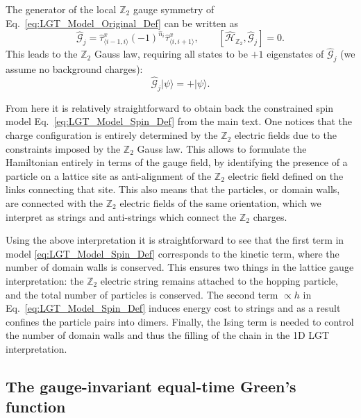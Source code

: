 \documentclass[pra,aps,showpacs,groupedaddress,superscriptaddress,twocolumn,toc=flat,biblatex,footinbib]{revtex4-1}
\newcommand{\ket}[1]{|#1\rangle}
\renewcommand{\H}{\hat{\mathcal{H}}}
\newcommand{\Zt}{$\mathbb{Z}_2$ }
\begin{document}
The generator of the local \Zt gauge symmetry of Eq.~\eqref{eq:LGT_Model_Original_Def} can be written as \cite{Prosko2017}
\begin{equation}
    \hat{\mathcal{G}}_j = \hat{\tau}^{x}_{\langle i-1, i \rangle}
    (-1)^{\hat{n}_i} \hat{\tau}^{x}_{\langle i, i+1 \rangle}, \qquad [\H_{\mathbb{Z}_2},\hat{\mathcal{G}}_j]=0.
    \label{eq:GaussLaw}
\end{equation}
This leads to the \Zt Gauss law, requiring all states to be $+1$ eigenstates of $\hat{\mathcal{G}}_j$ (we assume no background charges):
\begin{equation}
    \hat{\mathcal{G}}_j \ket{\psi} = + \ket{\psi}.
    \label{eq:GaussLawConstr1}
\end{equation}

From here it is relatively straightforward to obtain back the constrained spin model Eq.~\eqref{eq:LGT_Model_Spin_Def} from the main text. One notices that the charge configuration is entirely determined by the \Zt electric fields due to the constraints imposed by the \Zt Gauss law. This allows to formulate the Hamiltonian entirely in terms of the gauge field, by identifying  the presence of a particle on a lattice site as anti-alignment of the \Zt electric field defined on the links connecting that site. This also means that the particles, or domain walls, are connected with the \Zt electric fields of the same orientation, which we interpret as strings and anti-strings which connect the \Zt charges.

Using the above interpretation it is straightforward to see that the first term in model \eqref{eq:LGT_Model_Spin_Def} corresponds to the kinetic term, where the number of domain walls is conserved. This ensures two things in the lattice gauge interpretation: the \Zt electric string remains attached to the hopping particle, and the total number of particles is conserved.
The second term $\propto h$ in Eq.~\eqref{eq:LGT_Model_Spin_Def} induces energy cost to strings and as a result confines the particle pairs into dimers. Finally, the Ising term is needed to control the number of domain walls and thus the filling of the chain in the 1D LGT interpretation. 

\subsection{The gauge-invariant equal-time Green's function}
\end{document}
